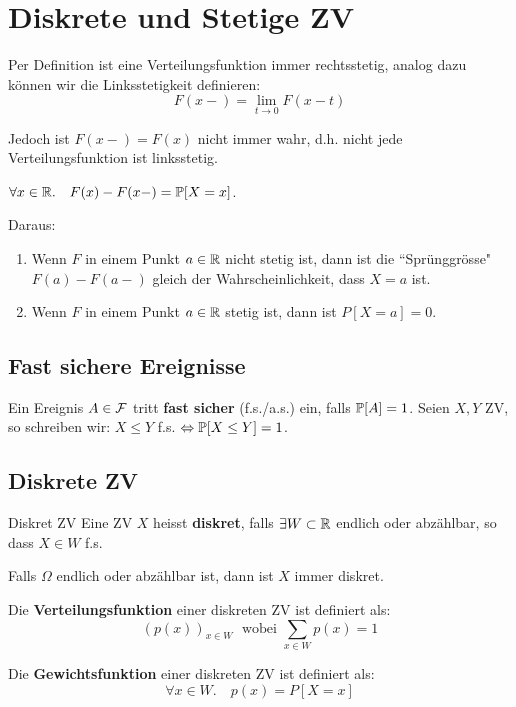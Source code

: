 \section{Diskrete und Stetige ZV}

Per Definition ist eine Verteilungsfunktion immer rechtsstetig, analog dazu können wir die Linksstetigkeit definieren: 
$$F(x-) = \lim_{t \to 0} F(x-t)$$ 

Jedoch ist $F(x-) = F(x)$ nicht immer wahr, d.h. nicht jede Verteilungsfunktion ist linksstetig. \medskip

\begin{mainbox}{} $\forall x \in \mathbb{R}. \quad F(x) - F(x-) = \mathbb{P}[X = x]$.
\end{mainbox}
Daraus:
\begin{enumerate}
    \item Wenn $F$ in einem Punkt $a \in \mathbb{R}$ nicht stetig ist, dann ist die ``Sprünggrösse" $F(a) - F(a-)$ gleich der Wahrscheinlichkeit, dass $X = a$ ist.
    \item Wenn $F$ in einem Punkt $a \in \mathbb{R}$ stetig ist, dann ist $P[X = a] = 0$.
\end{enumerate}

\subsection{Fast sichere Ereignisse}

Ein Ereignis $A \in \mathcal{F}$ tritt \textbf{fast sicher} (f.s./a.s.) ein, falls $\mathbb{P}[A] = 1$. Seien $X,Y$ ZV, so schreiben wir: $X \leq Y$ f.s. $\Leftrightarrow \mathbb{P}[X \leq Y] = 1$.


\subsection{Diskrete ZV}

\begin{mainbox}{Diskret ZV}
    Eine ZV $X$ heisst \textbf{diskret}, falls $\exists W \subset \mathbb{R}$ endlich oder abzählbar, so dass $X \in W$ f.s. 
\end{mainbox}
\begin{subbox}{}
    Falls $\Omega$ endlich oder abzählbar ist, dann ist $X$ immer diskret.
\end{subbox}

\begin{mainbox}{}
Die \textbf{Verteilungsfunktion} einer diskreten ZV ist definiert als: 
$$(p(x))_{x \in W} \; \text{ wobei } \sum_{x \in W} p(x) = 1$$
\end{mainbox}
\begin{mainbox}{}
Die \textbf{Gewichtsfunktion} einer diskreten ZV ist definiert als: 
$$\forall x \in W. \quad p(x) = P[X = x]$$
\end{mainbox}

